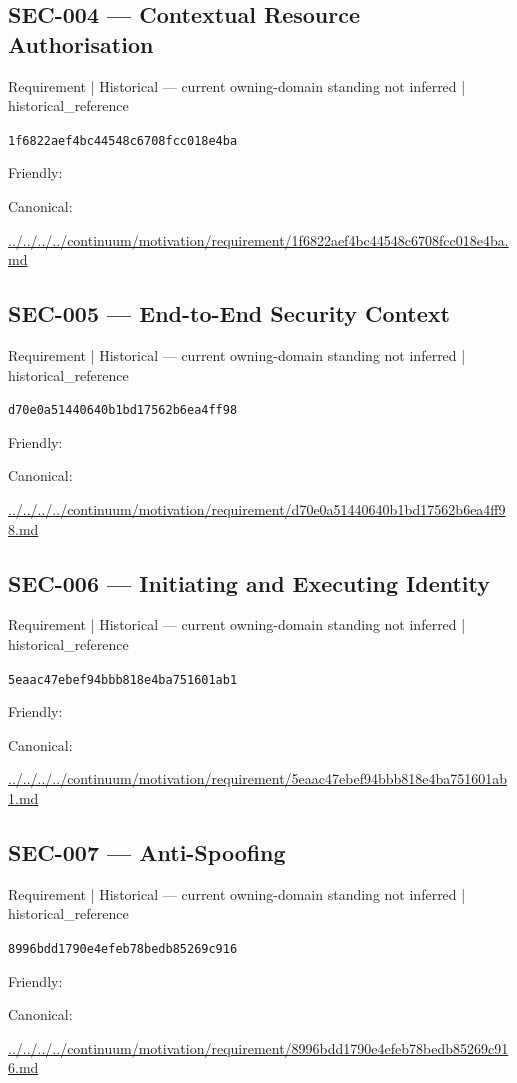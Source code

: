 \documentclass[10pt,a4paper]{article}
\begin{document}
\subsection*{SEC-004 — Contextual Resource Authorisation}
{\small Requirement | Historical — current owning-domain standing not inferred | historical\_reference}\par
\texttt{1f6822aef4bc44548c6708fcc018e4ba}\par
Friendly: \par
Canonical: \par
{\footnotesize\url{../../../../continuum/motivation/requirement/1f6822aef4bc44548c6708fcc018e4ba.md}}\par
\subsection*{SEC-005 — End-to-End Security Context}
{\small Requirement | Historical — current owning-domain standing not inferred | historical\_reference}\par
\texttt{d70e0a51440640b1bd17562b6ea4ff98}\par
Friendly: \par
Canonical: \par
{\footnotesize\url{../../../../continuum/motivation/requirement/d70e0a51440640b1bd17562b6ea4ff98.md}}\par
\subsection*{SEC-006 — Initiating and Executing Identity}
{\small Requirement | Historical — current owning-domain standing not inferred | historical\_reference}\par
\texttt{5eaac47ebef94bbb818e4ba751601ab1}\par
Friendly: \par
Canonical: \par
{\footnotesize\url{../../../../continuum/motivation/requirement/5eaac47ebef94bbb818e4ba751601ab1.md}}\par
\subsection*{SEC-007 — Anti-Spoofing}
{\small Requirement | Historical — current owning-domain standing not inferred | historical\_reference}\par
\texttt{8996bdd1790e4efeb78bedb85269c916}\par
Friendly: \par
Canonical: \par
{\footnotesize\url{../../../../continuum/motivation/requirement/8996bdd1790e4efeb78bedb85269c916.md}}\par
\end{document}
